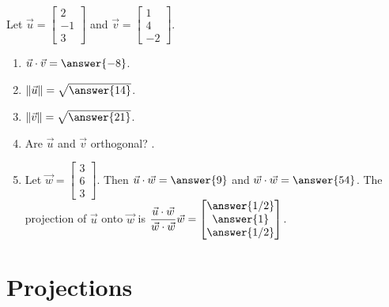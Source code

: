 \documentclass{ximera}
\begin{document}
\begin{example}
    Let $\vec{u} = \begin{bmatrix} 2 \\ -1 \\ 3 \end{bmatrix}$ and $\vec{v} = \begin{bmatrix} 1 \\ 4 \\ -2 \end{bmatrix}$.
    \begin{enumerate}
        \item $\vec{u} \cdot \vec{v} = \answer{-8}$.

        \item $\|\vec{u}\| = \sqrt{\answer{14}}$.

        \item $\|\vec{v}\| = \sqrt{\answer{21}}$.

        \item Are $\vec{u}$ and $\vec{v}$ orthogonal? .

        \item Let $\vec{w} = \begin{bmatrix} 3 \\ 6 \\ 3 \end{bmatrix}$. Then $\vec{u} \cdot \vec{w} = \answer{9}$ and $\vec{w} \cdot \vec{w} = \answer{54}$. The projection of $\vec{u}$ onto $\vec{w}$ is $\dfrac{\vec{u}\cdot\vec{w}}{\vec{w}\cdot\vec{w}}\vec{w} = \begin{bmatrix} \answer{1/2} \\ \answer{1} \\ \answer{1/2} \end{bmatrix}$.
    \end{enumerate}
\end{example}

\section*{Projections}
\end{document}
